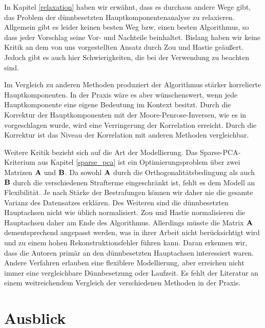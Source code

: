 In Kapitel \ref{relaxation} haben wir erwähnt, dass es durchaus andere Wege gibt, das Problem der dünnbesetzten Hauptkomponentenanalyse zu relaxieren. Allgemein gibt es leider keinen besten Weg bzw. einen besten Algorithmus, so dass jeder Vorschlag seine Vor- und Nachteile beinhaltet. Bislang haben wir keine Kritik an dem von uns vorgestellten Ansatz durch Zou und Hastie \cite{zou_sparsepca} geäußert. Jedoch gibt es auch hier Schwierigkeiten, die bei der Verwendung zu beachten sind. 

Im Vergleich zu anderen Methoden produziert der Algorithmus stärker korrelierte Hauptkomponenten. In der Praxis wäre es aber wünschenswert, wenn jede Hauptkomponente eine eigene Bedeutung im Kontext besitzt. Durch die Korrektur der Hauptkomponenten mit der Moore-Penrose-Inversen, wie es in \cite{camacho} vorgeschlagen wurde, wird eine Verringerung der Korrelation erreicht. Durch die Korrektur ist das Niveau der Korrelation mit anderen Methoden vergleichbar. 

Weitere Kritik bezieht sich auf die Art der Modellierung. Das Sparse-PCA-Kriterium aus Kapitel \ref{sparse_pca} ist ein Optimierungsproblem über zwei Matrizen $\mathbf{A}$ und $\mathbf{B}$. Da sowohl $\mathbf{A}$ durch die Orthogonalitätsbedingung als auch $\mathbf{B}$ durch die verschiedenen Strafterme eingeschränkt ist, fehlt es dem Modell an Flexibilität. Je nach Stärke der Bestrafungen können wir daher nie die gesamte Varianz des Datensatzes erklären. Des Weiteren sind die dünnbesetzten Hauptachsen nicht wie üblich normalisiert. Zou und Hastie normalisieren die Hauptachsen daher am Ende des Algorithmus. Allerdings müsste die Matrix $\mathbf{A}$ dementsprechend angepasst werden, was in ihrer Arbeit nicht berücksichtigt wird und zu einem hohen Rekonstruktionsfehler führen kann. Daran erkennen wir, dass die Autoren primär an den dünnbesetzten Hauptachsen interessiert waren. Andere Verfahren erlauben eine flexiblere Modellierung, aber erreichen nicht immer eine vergleichbare Dünnbesetzung oder Laufzeit. Es fehlt der Literatur an einem weitreichendem Vergleich der verschiedenen Methoden in der Praxis.




\section{Ausblick}

